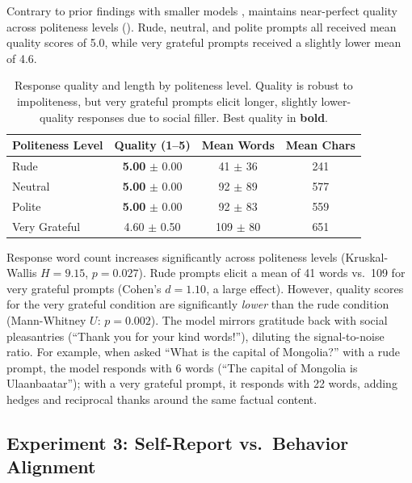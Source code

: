  Contrary to prior findings with smaller models \citep{yin2024politeness}, \gptfour maintains near-perfect quality across politeness levels (). Rude, neutral, and polite prompts all received mean quality scores of 5.0, while very grateful prompts received a slightly lower mean of 4.6.

\begin{table}[t]
    \centering
    \caption{Response quality and length by politeness level. Quality is robust to impoliteness, but very grateful prompts elicit longer, slightly lower-quality responses due to social filler. Best quality in \textbf{bold}.}
    \begin{tabular}{@{}lccc@{}}
        \toprule
        Politeness Level & Quality (1--5) & Mean Words & Mean Chars \\
        \midrule
        Rude & \textbf{5.00} {\scriptsize $\pm$ 0.00} & 41 {\scriptsize $\pm$ 36} & 241 \\
        Neutral & \textbf{5.00} {\scriptsize $\pm$ 0.00} & 92 {\scriptsize $\pm$ 89} & 577 \\
        Polite & \textbf{5.00} {\scriptsize $\pm$ 0.00} & 92 {\scriptsize $\pm$ 83} & 559 \\
        Very Grateful & 4.60 {\scriptsize $\pm$ 0.50} & 109 {\scriptsize $\pm$ 80} & 651 \\
        \bottomrule
    \end{tabular}
    \label{tab:exp2}
\end{table}

 Response word count increases significantly across politeness levels (Kruskal-Wallis $H = 9.15$, $p = 0.027$). Rude prompts elicit a mean of 41 words vs.\ 109 for very grateful prompts (Cohen's $d = 1.10$, a large effect). However, quality scores for the very grateful condition are significantly \emph{lower} than the rude condition (Mann-Whitney $U$: $p = 0.002$). The model mirrors gratitude back with social pleasantries (``Thank you for your kind words!''), diluting the signal-to-noise ratio. For example, when asked ``What is the capital of Mongolia?'' with a rude prompt, the model responds with 6 words (``The capital of Mongolia is Ulaanbaatar''); with a very grateful prompt, it responds with 22 words, adding hedges and reciprocal thanks around the same factual content.

\subsection{Experiment 3: Self-Report vs.\ Behavior Alignment}

